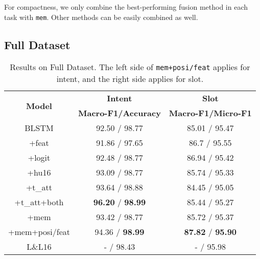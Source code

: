 For compactness, we only combine the best-performing fusion method in each task with \texttt{mem}. Other methods can be easily combined as well.



\subsection{Full Dataset}

\begin{table}
\setlength{\tabcolsep}{0.23em}
\centering
\small{
\begin{tabular}{|c|c|c|}

\hline
\multirow{2}{*}{\textbf{Model}} & \textbf{Intent} & \textbf{Slot} \\
\cline{2-3}
  & \textbf{Macro-F1/Accuracy} &  \textbf{Macro-F1/Micro-F1} \\
\hline
\rowcolor{Gray} BLSTM & 92.50 / 98.77  & 85.01 / 95.47\\
\hline
+feat & 91.86 / 97.65 & 86.7 / 95.55\\
\hline
\rowcolor{Gray} +logit & 92.48 / 98.77 & 86.94 / 95.42  \\
\hline
+hu16 & 93.09 / 98.77 & 85.74 / 95.33  \\
\hline
\rowcolor{Gray} +t\_att & 93.64 / 98.88  & 84.45 / 95.05\\
\hline
+t\_att+both & \textbf{96.20} / \textbf{98.99} & 85.44 / 95.27 \\
\hline
\rowcolor{Gray} +mem & 93.42 / 98.77 & 85.72 / 95.37\\
\hline
+mem+posi/feat & 94.36 / \textbf{98.99} & \textbf{87.82} / \textbf{95.90} \\
\hline
\hline
\rowcolor{Gray} L\&L16 & - / 98.43 & - / 95.98\\
\hline

\end{tabular}
}
\caption{Results on Full Dataset. The left side of \texttt{mem+posi/feat} applies for intent, and the right side applies for slot.}
\label{tab_full}
\end{table}

